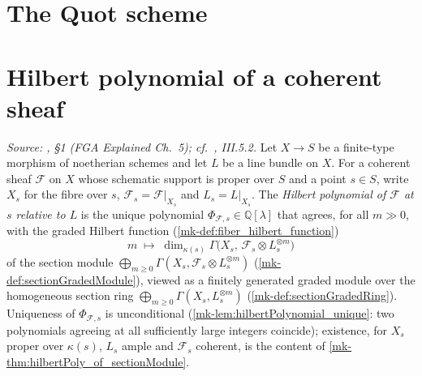 \section{The Quot scheme}
\label{mk-chap:Picard_QuotScheme}

\section{Hilbert polynomial of a coherent sheaf}
\label{mk-sec:hilbert_polynomial}

\begin{definition}\label{mk-def:hilbert_polynomial}
  \leanok

  \textit{Source: \cite{nitsure-hilbert-quot}, \S 1 (FGA Explained Ch.~5); cf.\ \cite{hartshorne-ag},
  III.5.2.}
  Let \(X \to S\) be a finite-type morphism of noetherian schemes and let \(L\)
  be a line bundle on \(X\). For a coherent sheaf \(\mathcal{F}\) on \(X\) whose
  schematic support is proper over \(S\) and a point \(s \in S\), write \(X_s\)
  for the fibre over \(s\), \(\mathcal{F}_s = \mathcal{F}|_{X_s}\) and
  \(L_s = L|_{X_s}\). The \emph{Hilbert polynomial of \(\mathcal{F}\) at \(s\)
  relative to \(L\)} is the unique polynomial
  \(\Phi_{\mathcal{F},s} \in \mathbb{Q}[\lambda]\) that agrees, for all
  \(m \gg 0\), with the graded Hilbert function
  (\ref{mk-def:fiber_hilbert_function})
  \[
    m \;\longmapsto\; \dim_{\kappa(s)} \Gamma\bigl(X_s,\, \mathcal{F}_s \otimes L_s^{\otimes m}\bigr)
  \]
  of the section module
  \(\bigoplus_{m \ge 0} \Gamma(X_s, \mathcal{F}_s \otimes L_s^{\otimes m})\)
  (\ref{mk-def:sectionGradedModule}), viewed as a finitely generated graded module
  over the homogeneous section ring
  \(\bigoplus_{m \ge 0} \Gamma(X_s, L_s^{\otimes m})\)
  (\ref{mk-def:sectionGradedRing}). Uniqueness of \(\Phi_{\mathcal{F},s}\) is
  unconditional (\ref{mk-lem:hilbertPolynomial_unique}: two polynomials agreeing
  at all sufficiently large integers coincide); existence, for \(X_s\) proper
  over \(\kappa(s)\), \(L_s\) ample and \(\mathcal{F}_s\) coherent, is the
  content of \ref{mk-thm:hilbertPoly_of_sectionModule}.


\end{definition}
